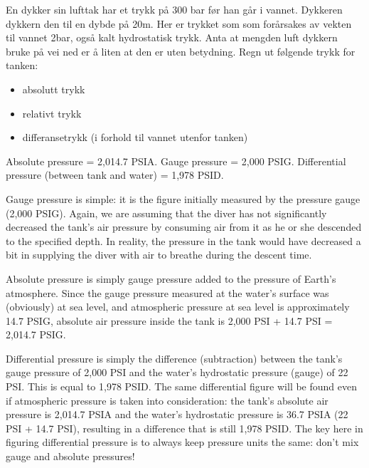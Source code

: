 En dykker sin lufttak har et trykk på 300 bar før han går i vannet. Dykkeren dykkern den til en dybde på 20m. Her er trykket som som forårsakes av vekten til vannet 2bar, også kalt hydrostatisk trykk. Anta at mengden luft dykkern bruke på vei ned er å liten at den er uten betydning. Regn ut følgende trykk for tanken:
\begin{itemize}
	\item absolutt trykk
	\item relativt trykk
	\item differansetrykk (i forhold til vannet utenfor tanken)
\end{itemize}







Absolute pressure = 2,014.7 PSIA.  Gauge pressure = 2,000 PSIG.  Differential pressure (between tank and water) = 1,978 PSID.

\vskip 10pt

Gauge pressure is simple: it is the figure initially measured by the pressure gauge (2,000 PSIG).  Again, we are assuming that the diver has not significantly decreased the tank's air pressure by consuming air from it as he or she descended to the specified depth.  In reality, the pressure in the tank would have decreased a bit in supplying the diver with air to breathe during the descent time.

Absolute pressure is simply gauge pressure added to the pressure of Earth's atmosphere.  Since the gauge pressure measured at the water's surface was (obviously) at sea level, and atmospheric pressure at sea level is approximately 14.7 PSIG, absolute air pressure inside the tank is 2,000 PSI + 14.7 PSI = 2,014.7 PSIG.

Differential pressure is simply the difference (subtraction) between the tank's gauge pressure of 2,000 PSI and the water's hydrostatic pressure (gauge) of 22 PSI.  This is equal to 1,978 PSID.  The same differential figure will be found even if atmospheric pressure is taken into consideration: the tank's absolute air pressure is 2,014.7 PSIA and the water's hydrostatic pressure is 36.7 PSIA (22 PSI + 14.7 PSI), resulting in a difference that is still 1,978 PSID.  The key here in figuring differential pressure is to always keep pressure units the same: don't mix gauge and absolute pressures!










